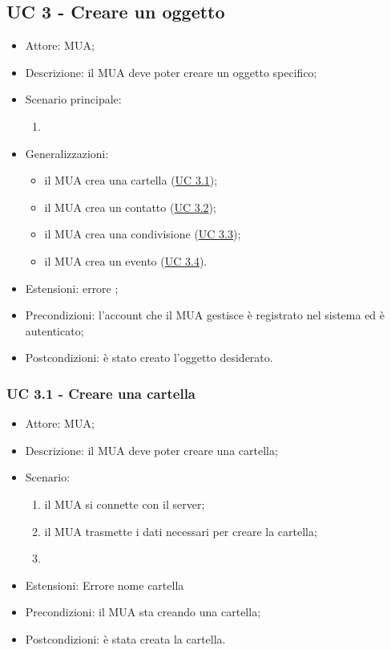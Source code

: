     \subsection{UC 3 - Creare un oggetto} \label{sec: UC 3}
    \begin{itemize}
        \item Attore: MUA;
        \item Descrizione: il MUA deve poter creare un oggetto specifico;
        \item Scenario principale:
            \begin{enumerate}
                \item 
            \end{enumerate}
        \item Generalizzazioni:
            \begin{itemize}
                \item il MUA crea una cartella (\hyperref[sec: UC 3.1]{UC 3.1});
                \item il MUA crea un contatto (\hyperref[sec: UC 3.2]{UC 3.2});
                \item il MUA crea una condivisione (\hyperref[sec: UC 3.3]{UC 3.3});
                \item il MUA crea un evento (\hyperref[sec: UC 3.4]{UC 3.4}).
            \end{itemize}
        \item Estensioni: errore ;
        \item Precondizioni: l’account che il MUA gestisce è registrato nel sistema ed è autenticato;
        \item Postcondizioni: è stato creato l’oggetto desiderato.
    \end{itemize}

    \subsubsection{UC 3.1 - Creare una cartella} \label{sec: UC 3.1}
    \begin{itemize}
        \item Attore: MUA;
        \item Descrizione: il MUA deve poter creare una cartella;
        \item Scenario:
            \begin{enumerate}
            \item il MUA si connette con il server;
            \item il MUA trasmette i dati necessari per creare la cartella; 
            \item %
            \end{enumerate}
        \item Estensioni: Errore nome cartella
        \item Precondizioni: il MUA sta creando una cartella;
        \item Postcondizioni: è stata creata la cartella.
    \end{itemize}

